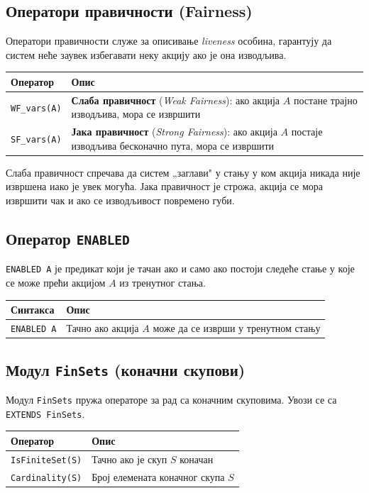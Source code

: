 \subsection{Оператори правичности (Fairness)}
Оператори правичности служе за описивање \textit{liveness} особина, гарантују да систем неће заувек
избегавати неку акцију ако је она изводљива.
\begin{center}
\begin{tabularx}{\textwidth}{|l|X|}
\hline
\textbf{Оператор} & \textbf{Опис} \\
\hline
\texttt{WF\_vars(A)} & \textbf{Слаба правичност} (\textit{Weak Fairness}): ако акција $A$ постане трајно изводљива, мора се извршити \\
\texttt{SF\_vars(A)} & \textbf{Јака правичност} (\textit{Strong Fairness}): ако акција $A$ постаје изводљива бесконачно пута, мора се извршити \\
\hline
\end{tabularx}
\end{center}
Слаба правичност спречава да систем „заглави" у стању у ком акција никада није извршена иако је увек могућа.
Јака правичност је строжа, акција се мора извршити чак и ако се изводљивост повремено губи.

\subsection{Оператор \texttt{ENABLED}}
\texttt{ENABLED A} је предикат који је тачан ако и само ако постоји следеће стање у које се може прећи акцијом $A$ из тренутног стања.
\begin{center}
\begin{tabularx}{\textwidth}{|l|X|}
\hline
\textbf{Синтакса} & \textbf{Опис} \\
\hline
\texttt{ENABLED A} & Тачно ако акција $A$ може да се изврши у тренутном стању \\
\hline
\end{tabularx}
\end{center}

\subsection{Модул \texttt{FinSets} (коначни скупови)}
Модул \texttt{FinSets} пружа операторе за рад са коначним скуповима. Увози се са \texttt{EXTENDS FinSets}.
\begin{center}
\begin{tabularx}{\textwidth}{|l|X|}
\hline
\textbf{Оператор} & \textbf{Опис} \\
\hline
\texttt{IsFiniteSet(S)} & Тачно ако је скуп $S$ коначан \\
\texttt{Cardinality(S)} & Број елемената коначног скупа $S$ \\
\hline
\end{tabularx}
\end{center}

